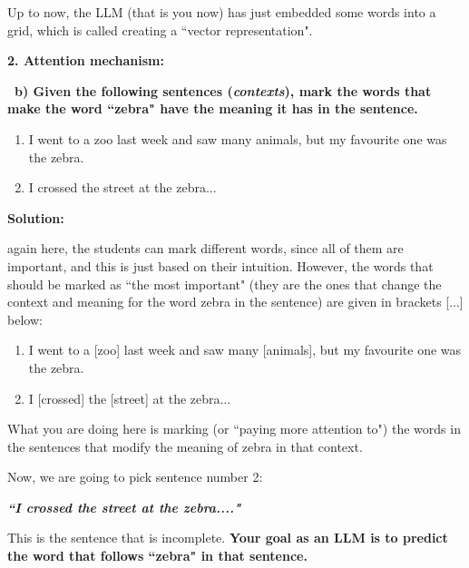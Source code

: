 \documentclass[12pt]{article}
\newenvironment{solution}{%
  \begin{solutionbox}\textbf{Solution:}
}{%
  \end{solutionbox}
}
\begin{document}
\begin{importantbox}
    Up to now, the LLM (that is you now) has just embedded some words into a grid, which is called creating a ``vector representation".
\end{importantbox}

\vspace{0.5cm}
\textbf{\large 2. Attention mechanism: }
\vspace{0.5cm}

\textcolor{maincolor}{\textbf{\faPen\ b) Given the following sentences (\textit{contexts}), mark the words that make the word ``zebra" have the meaning it has in the sentence.}}

\begin{enumerate}
    \item I went to a zoo last week and saw many animals, but my favourite one was the zebra.
    \item I crossed the street at the zebra...
\end{enumerate}

\begin{solution}
    again here, the students can mark different words, since all of them are important, and this is just based on their intuition. However, the words that should be marked as ``the most important" (they are the ones that change the context and meaning for the word zebra in the sentence) are given in brackets [...] below:

\begin{enumerate}
    \item I went to a [zoo] last week and saw many [animals], but my favourite one was the zebra.
    \item I [crossed] the [street] at the zebra...
\end{enumerate}
\end{solution}


\begin{importantbox}
    What you are doing here is marking (or ``paying more attention to") the words in the sentences that modify the meaning of zebra in that context.
\end{importantbox}

Now, we are going to pick sentence number 2:

\vspace{0.5cm}
\textbf{\textit{``I crossed the street at the \colorbox{orange!30}{zebra}...."}}
\vspace{0.5cm}

This is the sentence that is incomplete. \textbf{Your goal as an LLM is to predict the word that follows ``zebra" in that sentence.}
\end{document}
